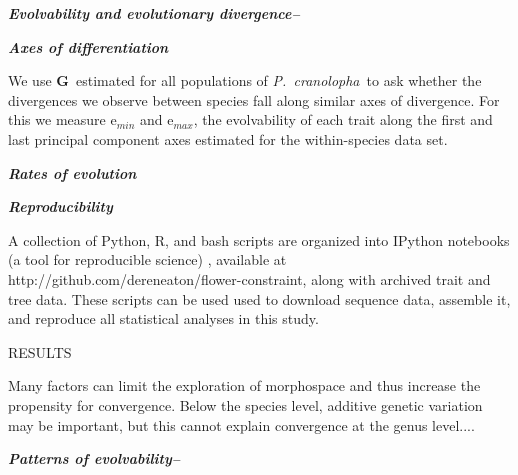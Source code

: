 \documentclass[12pt,letterpaper]{article}
\def\PC{\emph{P.~cranolopha}}
\def\GM{{\bf G}}
\renewcommand{\section}[1]{%
\bigskip
\begin{center}
\begin{large}
\normalfont\scshape #1
\medskip
\end{large}
\end{center}}
\renewcommand{\subsection}[1]{%
\bigskip
{\noindent \normalfont \bf \emph{#1}}
}
\begin{document}
\subsection{Evolvability and evolutionary divergence--}


\subsection{Axes of differentiation}
We use \GM~estimated for all populations of \PC~to ask whether the divergences we observe between
species fall along similar axes of divergence. For this we measure e$_{min}$ and e$_{max}$, the 
evolvability of each trait along the first and last principal component axes estimated for the 
within-species data set. 

\subsection{Rates of evolution}


\subsection{Reproducibility}
A collection of Python, R, and bash scripts are organized into IPython notebooks (a tool for reproducible science) \citep{}, available at http://github.com/dereneaton/flower-constraint, along with archived trait and tree data. These scripts can be used used to download sequence data, assemble it, and reproduce all statistical analyses in this study. 



\section{RESULTS}


Many factors can limit the exploration of morphospace and thus increase the propensity for convergence. Below the species level, additive genetic variation may be important, but this cannot explain convergence at the genus level....

\subsection{Patterns of evolvability--}
\end{document}
